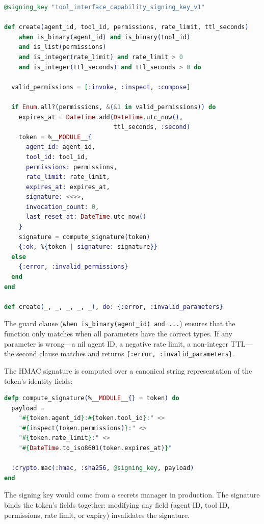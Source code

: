 \documentclass[12pt,a4paper]{article}
\theoremstyle{plain}
\theoremstyle{definition}
\begin{document}
\begin{lstlisting}[language=elixir, caption={Token creation with cryptographic signing.}, label={lst:cap-create}]
@signing_key "tool_interface_capability_signing_key_v1"

def create(agent_id, tool_id, permissions, rate_limit, ttl_seconds)
    when is_binary(agent_id) and is_binary(tool_id)
    and is_list(permissions)
    and is_integer(rate_limit) and rate_limit > 0
    and is_integer(ttl_seconds) and ttl_seconds > 0 do

  valid_permissions = [:invoke, :inspect, :compose]

  if Enum.all?(permissions, &(&1 in valid_permissions)) do
    expires_at = DateTime.add(DateTime.utc_now(),
                              ttl_seconds, :second)
    token = %__MODULE__{
      agent_id: agent_id,
      tool_id: tool_id,
      permissions: permissions,
      rate_limit: rate_limit,
      expires_at: expires_at,
      signature: <<>>,
      invocation_count: 0,
      last_reset_at: DateTime.utc_now()
    }
    signature = compute_signature(token)
    {:ok, %{token | signature: signature}}
  else
    {:error, :invalid_permissions}
  end
end

def create(_, _, _, _, _), do: {:error, :invalid_parameters}
\end{lstlisting}

The guard clause (\texttt{when is\_binary(agent\_id) and ...}) ensures that the function only matches when all parameters have the correct types. If any parameter is wrong---a nil agent ID, a negative rate limit, a non-integer TTL---the second clause matches and returns \texttt{\{:error, :invalid\_parameters\}}.

The HMAC signature is computed over a canonical string representation of the token's identity fields:

\begin{lstlisting}[language=elixir, caption={HMAC-SHA256 signature computation.}, label={lst:hmac}]
defp compute_signature(%__MODULE__{} = token) do
  payload =
    "#{token.agent_id}:#{token.tool_id}:" <>
    "#{inspect(token.permissions)}:" <>
    "#{token.rate_limit}:" <>
    "#{DateTime.to_iso8601(token.expires_at)}"

  :crypto.mac(:hmac, :sha256, @signing_key, payload)
end
\end{lstlisting}

The signing key would come from a secrets manager in production. The signature binds the token's fields together: modifying any field (agent ID, tool ID, permissions, rate limit, or expiry) invalidates the signature.
\end{document}
